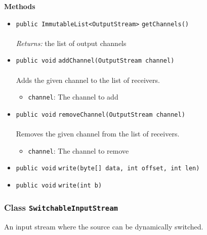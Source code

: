 \textbf{\sffamily Methods}
\begin{itemize}
\item \lstinline|public ImmutableList<OutputStream>| \lstinline|getChannels|\lstinline|()|\\ \\[-0.6em]
\emph{Returns:} the list of output channels



\item \lstinline|public void| \lstinline|addChannel|\lstinline|(OutputStream channel)|\\ \\[-0.6em]
Adds the given channel to the list of receivers.
\begin{itemize}
\item \lstinline|channel|: The channel to add
\end{itemize}



\item \lstinline|public void| \lstinline|removeChannel|\lstinline|(OutputStream channel)|\\ \\[-0.6em]
Removes the given channel from the list of receivers.
\begin{itemize}
\item \lstinline|channel|: The channel to remove
\end{itemize}



\item \lstinline|public void| \lstinline|write|\lstinline|(byte[] data, int offset, int len)| \\[-0.6em]




\item \lstinline|public void| \lstinline|write|\lstinline|(int b)| \\[-0.6em]




\end{itemize}

\subsubsection{Class \lstinline|SwitchableInputStream|}
An input stream where the source can be dynamically switched. \\
\noindent\begin{minipage}[t]{5cm}
\vspace{0.3em}
\hspace*{2em}
\vspace{0.3em}
\end{minipage}



